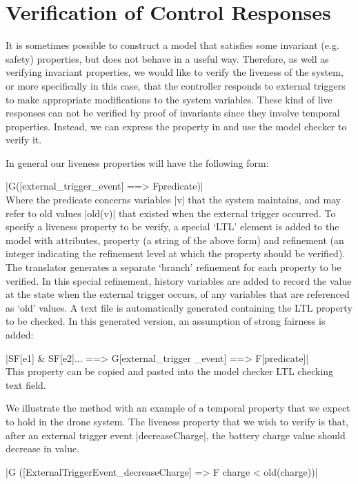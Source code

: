 

\section{Verification of Control Responses}

It is sometimes possible to construct a model that satisfies some invariant (e.g. safety) properties, but does not behave in a useful way.
Therefore, as well as verifying invariant properties, we would like to verify the liveness of the system, or more specifically in this case, that the controller responds to external triggers to make appropriate modifications to the system variables. 
These kind of live responses can not be verified by proof of invariants since they involve temporal properties.
Instead, we can express the property in \LTL  and use the \PROB model checker to verify it.

In general our liveness properties will have the following form:

	|G([external_trigger_event] ==> F{predicate})|
\\
Where the predicate concerns variables |v| that the system maintains, and may refer to old values |old(v)| that existed when the external trigger occurred.
To specify a liveness property to be verify, a special `LTL' element is added to the \SCXML model with attributes, property (a string of the above form)  and refinement (an integer indicating the refinement level at which the property should be verified).
The translator generates a separate `branch' refinement for each \LTL property to be verified. 
In this special refinement, history variables are added to record the value at the state when the external trigger occurs, of any variables that are referenced as `old' values.
A text file is automatically generated containing the LTL property to be checked. 
In this generated version, an assumption of strong fairness is added:

	|SF[e1] & SF[e2]... ==> G[external_trigger _event] ==> F[predicate]|
\\
This property can be copied and pasted into the \PROB model checker LTL checking text field.

We illustrate the method with an example of a temporal property that we expect to hold in the drone \SCXML system. 
The liveness property that we wish to  verify is that, after an external trigger event |decreaseCharge|, the battery charge value should  decrease in value.

	|G ([ExternalTriggerEvent_decreaseCharge] => F {charge < old(charge)})|
\\

